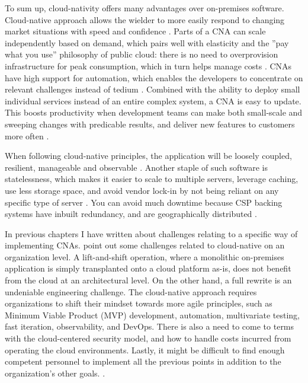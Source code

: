 \documentclass[utf8,english]{gradu3}
\begin{document}
To sum up, cloud-nativity offers many advantages over on-premises software.
Cloud-native approach allows the wielder to more easily respond to changing
market situations with speed and confidence \parencite{Microsoft2022-CNA}. Parts of
a CNA can scale independently based on demand, which pairs well with elasticity
and the ''pay what you use'' philosophy of public cloud: there is no need to
overprovision infrastructure for peak consumption, which in turn helps manage
costs \parencite{Patrizio2018}. CNAs have high support for automation, which
enables the developers to concentrate on relevant challenges instead of tedium
\parencite{Patrizio2018}. Combined with the ability to deploy small individual
services instead of an entire complex system, a CNA is easy to update. This
boosts productivity when development teams can make both small-scale and
sweeping changes with predicable results, and deliver new features to customers
more often \parencite{CNAF2018, Patrizio2018}.

When following cloud-native principles, the application will be loosely coupled,
resilient, manageable and observable \parencite{CNAF2018}. Another staple of
such software is statelessness, which makes it easier to scale to multiple
servers, leverage caching, use less storage space, and avoid vendor lock-in by
not being reliant on any specific type of server \parencite{Patrizio2018}. You
can avoid much downtime because CSP backing systems have inbuilt redundancy, and
are geographically distributed \parencite{Patrizio2018}.

In previous chapters I have written about challenges relating to a specific way
of implementing CNAs. \textcite{Patrizio2018} point out some challenges related
to cloud-native on an organization level. A lift-and-shift operation, where a
monolithic on-premises application is simply transplanted onto a cloud platform
as-is, does not benefit from the cloud at an architectural level. On the other
hand, a full rewrite is an undeniable engineering challenge. The cloud-native
approach requires organizations to shift their mindset towards more agile
principles, such as Minimum Viable Product (MVP) development, automation,
multivariate testing, fast iteration, observability, and DevOps. There is also a
need to come to terms with the cloud-centered security model, and how to handle
costs incurred from operating the cloud environments. Lastly, it might be
difficult to find enough competent personnel to implement all the previous
points in addition to the organization's other goals. \parencite{Patrizio2018}.
\end{document}
